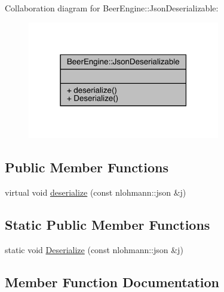 Collaboration diagram for Beer\+Engine\+:\+:Json\+Deserializable\+:\nopagebreak
\begin{figure}[H]
\begin{center}
\leavevmode
\includegraphics[width=238pt]{class_beer_engine_1_1_json_deserializable__coll__graph}
\end{center}
\end{figure}
\subsection*{Public Member Functions}
\begin{DoxyCompactItemize}
\item 
virtual void \mbox{\hyperlink{class_beer_engine_1_1_json_deserializable_ae1ce96bc441e544e7339641d80925726}{deserialize}} (const nlohmann\+::json \&j)
\end{DoxyCompactItemize}
\subsection*{Static Public Member Functions}
\begin{DoxyCompactItemize}
\item 
static void \mbox{\hyperlink{class_beer_engine_1_1_json_deserializable_af4c5582f75eb96988c5d4ff546218e1e}{Deserialize}} (const nlohmann\+::json \&j)
\end{DoxyCompactItemize}


\subsection{Member Function Documentation}
\mbox{\label{class_beer_engine_1_1_json_deserializable_ae1ce96bc441e544e7339641d80925726}} 
